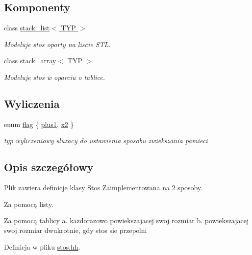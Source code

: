 \subsection*{Komponenty}
\begin{DoxyCompactItemize}
\item 
class \hyperlink{classstack__list}{stack\-\_\-list$<$ T\-Y\-P $>$}
\begin{DoxyCompactList}\small\item\em Modeluje stos oparty na liscie S\-T\-L. \end{DoxyCompactList}\item 
class \hyperlink{classstack__array}{stack\-\_\-array$<$ T\-Y\-P $>$}
\begin{DoxyCompactList}\small\item\em Modeluje stos w oparciu o tablice. \end{DoxyCompactList}\end{DoxyCompactItemize}
\subsection*{Wyliczenia}
\begin{DoxyCompactItemize}
\item 
enum \hyperlink{stos_8hh_a7847560c748814fd3070e9149a9578bd}{flag} \{ \hyperlink{stos_8hh_a7847560c748814fd3070e9149a9578bda4d2a3aa75111d5d02328fb5d495729c2}{plus1}, 
\hyperlink{stos_8hh_a7847560c748814fd3070e9149a9578bdac9b6e8d1af7ce8ae332595ccf954567c}{x2}
 \}
\begin{DoxyCompactList}\small\item\em typ wyliczeniowy sluzacy do ustawienia sposobu zwiekszania pamieci \end{DoxyCompactList}\end{DoxyCompactItemize}


\subsection{Opis szczegółowy}
Plik zawiera definicje klasy {\ttfamily Stos} Zaimplementowana na 2 sposoby. 
\begin{DoxyEnumerate}
\item Za pomocą listy.
\item Za pomocą tablicy a. kazdorazowo powiekszajacej swoj rozmiar b. powiekszajacej swoj rozmiar dwukrotnie, gdy stos sie przepelni 
\end{DoxyEnumerate}

Definicja w pliku \hyperlink{stos_8hh_source}{stos.\-hh}.



